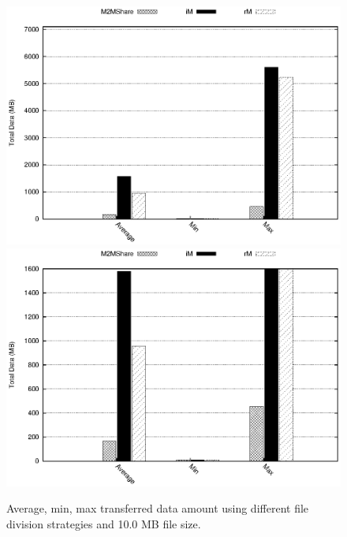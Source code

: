 \begin{figure}[htbp]
\centering%
\subfigure%
{\includegraphics{grafici/dataDFS_10MB.eps}}\qquad\qquad
\subfigure%
{\includegraphics{grafici/dataDFS_10MB_zoom.eps}}
\caption{Average, min, max transferred data amount using different file division strategies and 10.0 MB file size.\label{graficoDataFDS_10MB}}
\end{figure}


